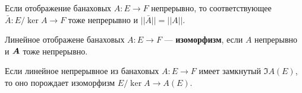 
\begin{to_lem}
	Если отображение банаховых $A \colon E \to F$ непрерывно, то соответствующее $\bar{A} \colon E/\ker A \to F$ тоже непрерывно и $||\bar{A}|| = ||A||$.
\end{to_lem}

\begin{to_def}
	Линейное отображене банаховых $A \colon E \to F$ --- \textbf{изоморфизм}, если $A$ непрерывно и $\mbox{\boldmath $A$}$ тоже непрерывно.
\end{to_def}

\begin{to_def}
	Если линейное непрерывное из банаховых $A \colon E \to F$ имеет замкнутый $\Im A(E)$, то оно порождает изоморфизм $E/\ker A \to A(E)$.
\end{to_def}